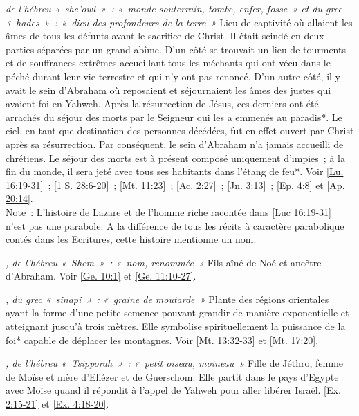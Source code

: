 \begin{multicols}{2}
\textit{de l'hébreu «~she'owl~»~: «~monde souterrain, tombe, enfer, fosse~» et du grec «~hades~»~: «~dieu des profondeurs de la terre~»}\newline
Lieu de captivité où allaient les âmes de tous les défunts avant le sacrifice de Christ. Il était scindé en deux parties séparées par un grand abîme. D'un côté se trouvait un lieu de tourments et de souffrances extrêmes accueillant tous les méchants qui ont vécu dans le péché durant leur vie terrestre et qui n'y ont pas renoncé. D'un autre côté, il y avait le sein d'Abraham où reposaient et séjournaient les âmes des justes qui avaient foi en Yahweh. Après la résurrection de Jésus, ces derniers ont été arrachés du séjour des morts par le Seigneur qui les a emmenés au paradis*. Le ciel, en tant que destination des personnes décédées, fut en effet ouvert par Christ après sa résurrection. Par conséquent, le sein d'Abraham n'a jamais accueilli de chrétiens. Le séjour des morts est à présent composé uniquement d'impies~; à la fin du monde, il sera jeté avec tous ses habitants dans l'étang de feu*. Voir \vref{Lu. 16:19-31}~; \vref{1 S. 28:6-20}~; \vref{Mt. 11:23}~; \vref{Ac. 2:27}~; \vref{Jn. 3:13}~; \vref{Ep. 4:8} et \vref{Ap. 20:14}.
\\Note~: L'histoire de Lazare et de l'homme riche racontée dans \vref{Luc 16:19-31} n'est pas une parabole. A la différence de tous les récits à caractère parabolique contés dans les Ecritures, cette histoire mentionne un nom.

\textit{, de l'hébreu «~Shem~»~: «~nom, renommée~»}\newline
Fils aîné de Noé et ancêtre d'Abraham. Voir \vref{Ge. 10:1} et \vref{Ge. 11:10-27}.

\textit{, du grec «~sinapi~»~: «~graine de moutarde~»}\newline
Plante des régions orientales ayant la forme d'une petite semence pouvant grandir de manière exponentielle et atteignant jusqu'à trois mètres. Elle symbolise spirituellement la puissance de la foi* capable de déplacer les montagnes. Voir \vref{Mt. 13:32-33} et \vref{Mt. 17:20}.

\textit{, de l'hébreu «~Tsipporah~»~: «~petit oiseau, moineau~»}\newline
Fille de Jéthro, femme de Moïse et mère d'Eliézer et de Guerschom. Elle partit dans le pays d'Egypte avec Moïse quand il répondit à l'appel de Yahweh pour aller libérer Israël. \vref{Ex. 2:15-21} et \vref{Ex. 4:18-20}.


\end{multicols}
